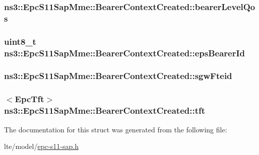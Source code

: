 \subsubsection[{\texorpdfstring{bearer\+Level\+Qos}{bearerLevelQos}}]{ ns3\+::\+Epc\+S11\+Sap\+Mme\+::\+Bearer\+Context\+Created\+::bearer\+Level\+Qos}\hypertarget{structns3_1_1EpcS11SapMme_1_1BearerContextCreated_ad7e1c32b27a8d21e15525d9efb493259}{}\label{structns3_1_1EpcS11SapMme_1_1BearerContextCreated_ad7e1c32b27a8d21e15525d9efb493259}
\subsubsection[{\texorpdfstring{eps\+Bearer\+Id}{epsBearerId}}]{\setlength{\rightskip}{0pt plus 5cm}uint8\+\_\+t ns3\+::\+Epc\+S11\+Sap\+Mme\+::\+Bearer\+Context\+Created\+::eps\+Bearer\+Id}\hypertarget{structns3_1_1EpcS11SapMme_1_1BearerContextCreated_a8df63b8f49023da108c17d82a180f239}{}\label{structns3_1_1EpcS11SapMme_1_1BearerContextCreated_a8df63b8f49023da108c17d82a180f239}
\subsubsection[{\texorpdfstring{sgw\+Fteid}{sgwFteid}}]{ ns3\+::\+Epc\+S11\+Sap\+Mme\+::\+Bearer\+Context\+Created\+::sgw\+Fteid}\hypertarget{structns3_1_1EpcS11SapMme_1_1BearerContextCreated_a0e20cfc35014ac53ab074e00ba00cb83}{}\label{structns3_1_1EpcS11SapMme_1_1BearerContextCreated_a0e20cfc35014ac53ab074e00ba00cb83}
\subsubsection[{\texorpdfstring{tft}{tft}}]{$<${\bf Epc\+Tft}$>$ ns3\+::\+Epc\+S11\+Sap\+Mme\+::\+Bearer\+Context\+Created\+::tft}\hypertarget{structns3_1_1EpcS11SapMme_1_1BearerContextCreated_a3d0108bd9e2a5956e7d21ff71329ac26}{}\label{structns3_1_1EpcS11SapMme_1_1BearerContextCreated_a3d0108bd9e2a5956e7d21ff71329ac26}


The documentation for this struct was generated from the following file\+:\begin{DoxyCompactItemize}
\item 
lte/model/\hyperlink{epc-s11-sap_8h}{epc-\/s11-\/sap.\+h}\end{DoxyCompactItemize}
